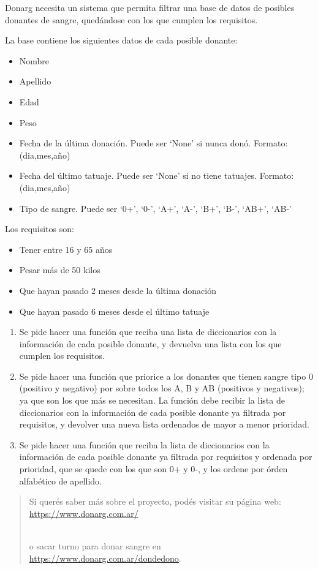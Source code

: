 \documentclass[
  letterpaper,
  DIV=11,
  numbers=noendperiod]{scrreprt}
\providecommand{\tightlist}{%
  \setlength{\itemsep}{0pt}\setlength{\parskip}{0pt}}\usepackage{longtable,booktabs,array}
\begin{document}
\begin{enumerate}
  Donarg necesita un sistema que permita filtrar una base de datos de
  posibles donantes de sangre, quedándose con los que cumplen los
  requisitos.

  La base contiene los siguientes datos de cada posible donante:

  \begin{itemize}
  \tightlist
  \item
    Nombre
  \item
    Apellido
  \item
    Edad
  \item
    Peso
  \item
    Fecha de la última donación. Puede ser `None' si nunca donó.
    Formato: (dia,mes,año)
  \item
    Fecha del último tatuaje. Puede ser `None' si no tiene tatuajes.
    Formato: (dia,mes,año)
  \item
    Tipo de sangre. Puede ser `0+', `0-', `A+', `A-', `B+', `B-', `AB+',
    `AB-'
  \end{itemize}

  Los requisitos son:

  \begin{itemize}
  \tightlist
  \item
    Tener entre 16 y 65 años
  \item
    Pesar más de 50 kilos
  \item
    Que hayan pasado 2 meses desde la última donación
  \item
    Que hayan pasado 6 meses desde el último tatuaje
  \end{itemize}

  \begin{enumerate}
  \def\labelenumii{\alph{enumii}.}
  \item
    Se pide hacer una función que reciba una lista de diccionarios con
    la información de cada posible donante, y devuelva una lista con los
    que cumplen los requisitos.
  \item
    Se pide hacer una función que priorice a los donantes que tienen
    sangre tipo 0 (positivo y negativo) por sobre todos los A, B y AB
    (positivos y negativos); ya que son los que más se necesitan. La
    función debe recibir la lista de diccionarios con la información de
    cada posible donante ya filtrada por requisitos, y devolver una
    nueva lista ordenados de mayor a menor prioridad.
  \item
    Se pide hacer una función que reciba la lista de diccionarios con la
    información de cada posible donante ya filtrada por requisitos y
    ordenada por prioridad, que se quede con los que son 0+ y 0-, y los
    ordene por órden alfabético de apellido.
  \end{enumerate}

  \begin{quote}
  Si querés saber más sobre el proyecto, podés visitar su página web:\\
  \url{https://www.donarg.com.ar/}\strut \\
  o sacar turno para donar sangre en\\
  \url{https://www.donarg.com.ar/dondedono}.
  \end{quote}
\end{enumerate}
\end{document}
